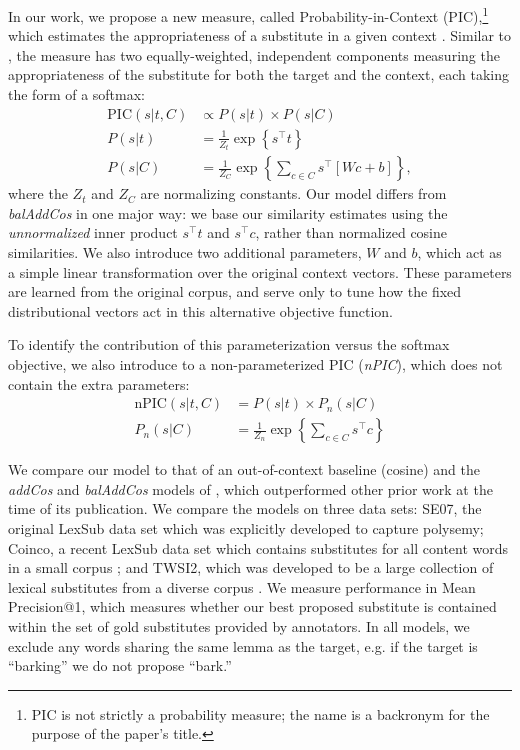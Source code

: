 In our work, we propose a new measure, called Probability-in-Context (PIC),\footnote{PIC is not strictly a probability measure; the name is a backronym for the purpose of the paper's title.}
which estimates the appropriateness of a substitute in a given context
\cite{roller:2016:naacl}.  Similar to \balAddCos, the measure has two
equally-weighted, independent components measuring the appropriateness of the
substitute for both the target and the context, each taking the form of a
softmax:
\begin{equation}
  \begin{aligned}
  \mbox{PIC}(s | t, C) &\propto P(s | t) \times P(s | C)\\
  P(s | t) &= \frac{1}{Z_t}\exp\left\{s^\top t\right\}\\
  P(s | C) &= \frac{1}{Z_C}\exp\left\{\sum_{c\in C}s^\top\left[Wc + b\right]\right\},
  \end{aligned}
  \label{eqn:pic}
\end{equation}
where the $Z_t$ and $Z_C$ are normalizing constants.
Our model differs from {\em balAddCos} in one major way: we base our similarity
estimates using the {\em unnormalized} inner product $s^\top t$ and $s^\top c$,
rather than normalized cosine similarities. We also introduce two additional
parameters, $W$ and $b$, which act as a simple linear transformation over the
original context vectors. These parameters are learned from the original
corpus, and serve only to tune how the fixed distributional vectors act in this
alternative objective function.

To identify the contribution of this parameterization versus the softmax
objective, we also introduce to a non-parameterized PIC ({\em nPIC}), which
does not contain the extra parameters:
\begin{equation}
  \begin{aligned}
  \mbox{nPIC}(s | t, C) &= P(s | t) \times P_n(s | C)\\
  P_n(s | C) &= \frac{1}{Z_n}\exp\left\{\sum_{c\in C}s^\top c\right\}
  \end{aligned}
  \label{eqn:npic}
\end{equation}

We compare our model to that of an out-of-context baseline (cosine) and the
{\em addCos} and {\em balAddCos} models of , which
outperformed other prior work at the time of its publication. We compare the
models on three data sets: SE07, the original LexSub data set
\cite{mccarthy:2007:semeval} which was explicitly developed to capture polysemy;
Coinco, a recent LexSub data set which contains substitutes for all content
words in a small corpus \cite{kremer:2014:eacl}; and TWSI2, which was developed
to be a large collection of lexical substitutes from a diverse corpus
\cite{biemann:2012:lrec}. We measure performance in Mean Precision@1, which
measures whether our best proposed substitute is contained within the set of gold
substitutes provided by annotators. In all models, we exclude any words sharing
the same lemma as the target, e.g. if the target is ``barking'' we do not
propose ``bark.''


